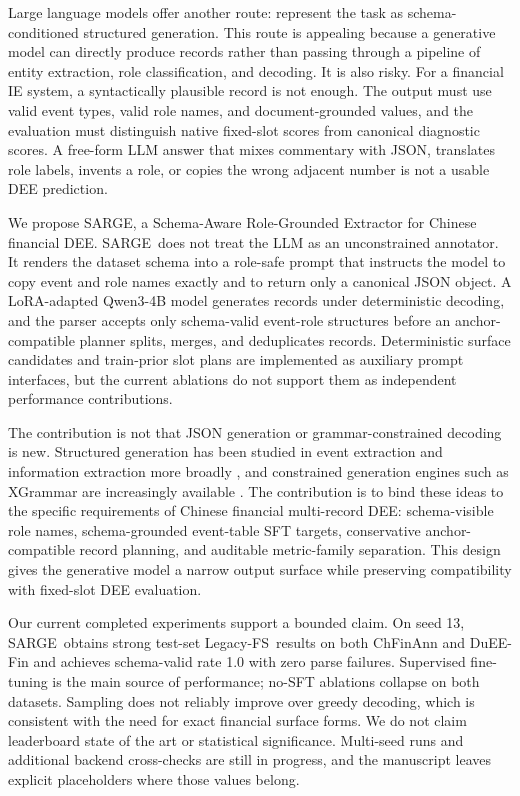 \documentclass[11pt]{article}
\newcommand{\method}{SARGE}
\newcommand{\legacy}{Legacy-FS}
\begin{document}
Large language models offer another route: represent the task as schema-conditioned structured generation. This route is appealing because a generative model can directly produce records rather than passing through a pipeline of entity extraction, role classification, and decoding. It is also risky. For a financial IE system, a syntactically plausible record is not enough. The output must use valid event types, valid role names, and document-grounded values, and the evaluation must distinguish native fixed-slot scores from canonical diagnostic scores. A free-form LLM answer that mixes commentary with JSON, translates role labels, invents a role, or copies the wrong adjacent number is not a usable DEE prediction.

We propose \method, a Schema-Aware Role-Grounded Extractor for Chinese financial DEE. \method\ does not treat the LLM as an unconstrained annotator. It renders the dataset schema into a role-safe prompt that instructs the model to copy event and role names exactly and to return only a canonical JSON object. A LoRA-adapted Qwen3-4B model \citep{qwen3technical,hu2022lora} generates records under deterministic decoding, and the parser accepts only schema-valid event-role structures before an anchor-compatible planner splits, merges, and deduplicates records. Deterministic surface candidates and train-prior slot plans are implemented as auxiliary prompt interfaces, but the current ablations do not support them as independent performance contributions.

The contribution is not that JSON generation or grammar-constrained decoding is new. Structured generation has been studied in event extraction and information extraction more broadly \citep{lu2021text2event,lu2022uie,hsu2022degree,sainz2024gollie}, and constrained generation engines such as XGrammar are increasingly available \citep{dong2024xgrammar}. The contribution is to bind these ideas to the specific requirements of Chinese financial multi-record DEE: schema-visible role names, schema-grounded event-table SFT targets, conservative anchor-compatible record planning, and auditable metric-family separation. This design gives the generative model a narrow output surface while preserving compatibility with fixed-slot DEE evaluation.

Our current completed experiments support a bounded claim. On seed 13, \method\ obtains strong test-set \legacy\ results on both ChFinAnn and DuEE-Fin and achieves schema-valid rate 1.0 with zero parse failures. Supervised fine-tuning is the main source of performance; no-SFT ablations collapse on both datasets. Sampling does not reliably improve over greedy decoding, which is consistent with the need for exact financial surface forms. We do not claim leaderboard state of the art or statistical significance. Multi-seed runs and additional backend cross-checks are still in progress, and the manuscript leaves explicit placeholders where those values belong.
\end{document}
